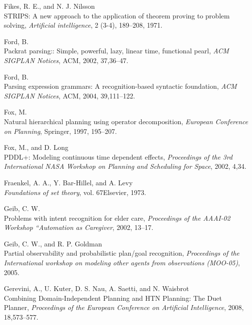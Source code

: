 \documentclass[11pt,a4paper,twoside,openright,titlepage,numbers=noenddot,headinclude,cleardoublepage=empty,openany]{scrreprt}
\theoremstyle{plain}
\theoremstyle{definition}
\theoremstyle{remark}
\begin{document}
\leavevmode\hypertarget{ref-fikes_strips_1971}{}%
Fikes, R. E., and N. J. Nilsson\\
STRIPS: A new approach to the application of theorem proving to problem
solving, \emph{Artificial intelligence}, 2 (3-4), 189--208, 1971.

\leavevmode\hypertarget{ref-ford_packrat_2002}{}%
Ford, B.\\
Packrat parsing:: Simple, powerful, lazy, linear time, functional pearl,
\emph{ACM SIGPLAN Notices}, ACM, 2002, 37,36--47.

\leavevmode\hypertarget{ref-ford_parsing_2004}{}%
Ford, B.\\
Parsing expression grammars: A recognition-based syntactic foundation,
\emph{ACM SIGPLAN Notices}, ACM, 2004, 39,111--122.

\leavevmode\hypertarget{ref-fox_natural_1997}{}%
Fox, M.\\
Natural hierarchical planning using operator decomposition,
\emph{European Conference on Planning}, Springer, 1997, 195--207.

\leavevmode\hypertarget{ref-fox_pddl_2002}{}%
Fox, M., and D. Long\\
PDDL+: Modeling continuous time dependent effects, \emph{Proceedings of
the 3rd International NASA Workshop on Planning and Scheduling for
Space}, 2002, 4,34.

\leavevmode\hypertarget{ref-fraenkel_foundations_1973}{}%
Fraenkel, A. A., Y. Bar-Hillel, and A. Levy\\
\emph{Foundations of set theory}, vol. 67Elsevier, 1973.

\leavevmode\hypertarget{ref-geib_problems_2002}{}%
Geib, C. W.\\
Problems with intent recognition for elder care, \emph{Proceedings of
the AAAI-02 Workshop ``Automation as Caregiver}, 2002, 13--17.

\leavevmode\hypertarget{ref-geib_partial_2005}{}%
Geib, C. W., and R. P. Goldman\\
Partial observability and probabilistic plan/goal recognition,
\emph{Proceedings of the International workshop on modeling other agents
from observations (MOO-05)}, 2005.

\leavevmode\hypertarget{ref-gerevini_combining_2008}{}%
Gerevini, A., U. Kuter, D. S. Nau, A. Saetti, and N. Waisbrot\\
Combining Domain-Independent Planning and HTN Planning: The Duet
Planner, \emph{Proceedings of the European Conference on Artificial
Intelligence}, 2008, 18,573--577.
\end{document}
